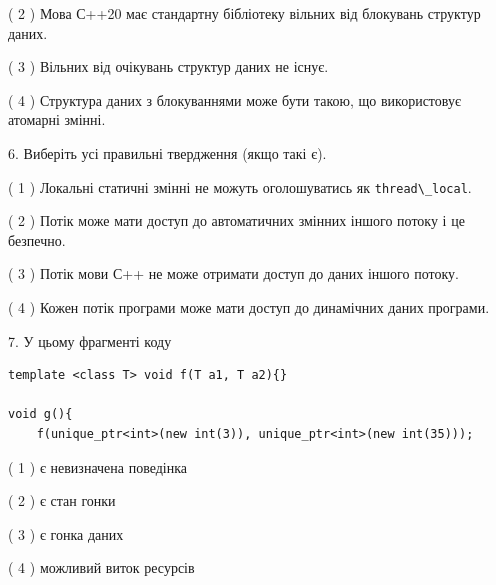 \documentclass[12pt, ukrainian]{article}
\def\code#1{\Verb!#1!}
\begin{document}
\begin {large}
{( 2 ) Мова С++20 має стандартну бібліотеку вільних від блокувань структур даних.%

( 3 ) Вільних від очікувань структур даних не існує.%

( 4 ) Структура даних з блокуваннями може бути такою, що використовує атомарні змінні.%
\newpage



\vspace{5mm}
6. Виберіть усі правильні твердження (якщо такі є).\par
\vspace{2mm}

( 1 ) Локальні статичні змінні не можуть оголошуватись як \code{thread\_local}.%

( 2 ) Потік може мати доступ до автоматичних змінних іншого потоку і це безпечно.%

( 3 ) Потік мови С++ не може отримати доступ до даних іншого потоку.%

( 4 ) Кожен потік програми може мати доступ до динамічних даних програми.%


\vspace{5mm}
7. У цьому фрагменті коду
\begin{verbatim}
template <class T> void f(T a1, T a2){}

void g(){
    f(unique_ptr<int>(new int(3)), unique_ptr<int>(new int(35)));
\end{verbatim}

( 1 ) є невизначена поведінка%

( 2 ) є стан гонки%

( 3 ) є гонка даних%

( 4 ) можливий виток ресурсів%
}
\end {large}
\end{document}
